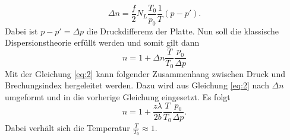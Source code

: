 \begin{equation*}
  \Delta n = \frac{f}{2} N_L \frac{T_0}{p_0}\frac{1}{T} (p-p').
\end{equation*}
Dabei ist $p-p'=\Delta p$ die Druckdifferenz der Platte.
Nun soll die klassische Dispersionstheorie erfüllt werden und somit gilt dann
\begin{equation*}
  n = 1 + \Delta n \frac{T}{T_0} \frac{p_0}{\Delta p}
\end{equation*}
Mit der Gleichung \ref{eq:2} kann folgender Zusammenhang zwischen Druck und Brechungsindex
hergeleitet werden. Dazu wird aus Gleichung \ref{eq:2} nach $\Delta n$ umgeformt und
in die vorherige Gleichung eingesetzt. Es folgt
\begin{equation}
  n = 1 + \frac{z \lambda}{2b} \frac{T}{T_0} \frac{p_0}{\Delta p}.
  \label{eq:3}
\end{equation}
Dabei verhält sich die Temperatur $\frac{T}{T_0} \approx 1$.
